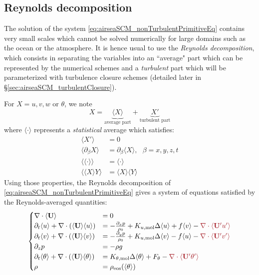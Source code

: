 \subsection{Reynolds decomposition}
The solution of the system \eqref{eq:airseaSCM_nonTurbulentPrimitiveEq}
contains very small scales which cannot be solved numerically for
large domains such as the ocean or the atmosphere. It is hence usual
to use the \textit{Reynolds decomposition}, which consists in
separating the variables into an ``average" part which can be
represented by the numerical schemes and a \textit{turbulent}
part which will be parameterized with turbulence closure schemes
(detailed later in \S \ref{sec:airseaSCM_turbulentClosure}).
\par
For $X=u, v, w$ or $\theta$, we note
\begin{equation}
	X =
	\underbrace{\langle X\rangle}_{\text{average part}}
	+
	\underbrace{
	\left.X'\right.
}_{\text{turbulent part}}
\end{equation}
where $\langle \cdot \rangle$ represents a \textit{statistical}
average which satisfies:
\begin{equation}
\begin{aligned}
	\langle X' \rangle &= 0 \\
	\langle \partial_\beta X \rangle &=
	\partial_\beta \langle  X \rangle, ~~~\beta=x,y,z,t \\
	\langle\langle \cdot \rangle\rangle &= \langle \cdot \rangle \\
	\langle \langle X \rangle Y\rangle &= \langle X \rangle\langle Y \rangle
\end{aligned}
\end{equation}
Using those properties, the Reynolds decomposition of 
\eqref{eq:airseaSCM_nonTurbulentPrimitiveEq} gives a system
of equations satisfied by the Reynolds-averaged quantities:
\begin{equation}
	\label{eq:airseaSCM_TurbulentPrimitiveEq}
\begin{cases}
	\nabla \cdot \langle\mathbf{U}\rangle &= 0 \\
	\partial_t \langle u \rangle+ \nabla \cdot
	(\langle\mathbf{U}\rangle \langle u\rangle) &=
	- \frac{\partial_x  p}{\rho_0} +
	K_{u, {\rm mol}} \Delta \langle u\rangle
	+ f \langle v\rangle - \emphase{\nabla \cdot \langle
	\mathbf{U}' u'\rangle}\\
	\partial_t \langle v\rangle + \nabla \cdot
	(\langle \mathbf{U}\rangle \langle v\rangle) &=
	- \frac{\partial_y  p}{\rho_0} +
	K_{u, {\rm mol}} \Delta \langle v\rangle
	- f \langle u\rangle  - \emphase{\nabla \cdot \langle
	\mathbf{U}' v'\rangle}\\
	\partial_z p &= -\rho g \\
	\partial_t \langle\theta\rangle + \nabla \cdot
	(\langle\mathbf{U}\rangle \langle\theta\rangle) &=
	K_{\theta, {\rm mol}} \Delta \langle\theta\rangle
	+ F_\theta - \emphase{\nabla \cdot \langle
	\mathbf{U}' \theta'\rangle}\\
	\rho &= \rho_{\rm eos}(\langle\theta\rangle)
\end{cases}
\end{equation}
